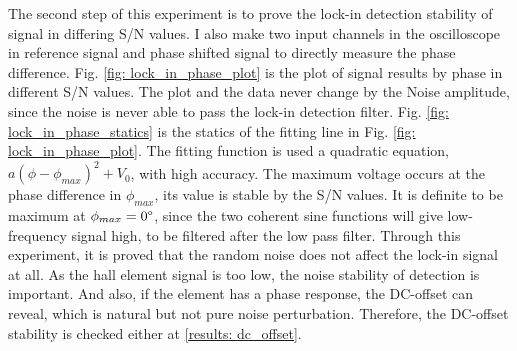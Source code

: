 \documentclass{article}
\begin{document}
 The second step of this experiment is to prove the lock-in detection stability of signal in differing S/N values.
 I also make two input channels in the oscilloscope in reference signal and phase shifted signal to directly measure the phase difference.
 Fig. \ref{fig: lock_in_phase_plot} is the plot of signal results by phase in different S/N values.
 The plot and the data never change by the Noise amplitude, since the noise is never able to pass the lock-in detection filter.
 Fig. \ref{fig: lock_in_phase_statics} is the statics of the fitting line in Fig. \ref{fig: lock_in_phase_plot}.
 The fitting function is used a quadratic equation, $a(\phi - \phi_{max})^2 + V_0$, with high accuracy.
 The maximum voltage occurs at the phase difference in $\phi_{max}$, its value is stable by the S/N values.
 It is definite to be maximum at $\phi_{max}=0 \degree$, since the two coherent sine functions will give low-frequency signal high,
 to be filtered after the low pass filter.
 Through this experiment, it is proved that the random noise does not affect the lock-in signal at all.
 As the hall element signal is too low, the noise stability of detection is important.
 And also, if the element has a phase response, the DC-offset can reveal, which is natural but not pure noise perturbation.
 Therefore, the DC-offset stability is checked either at \ref{results: dc_offset}.
\end{document}

